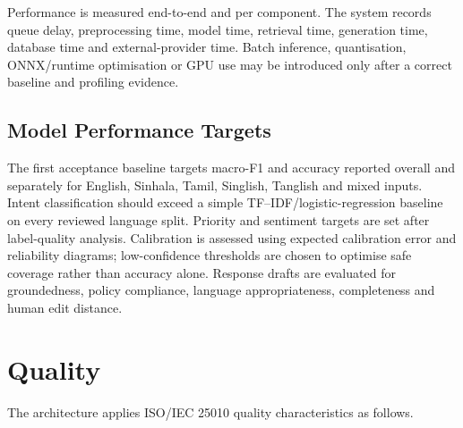 \documentclass[10pt,letterpaper]{article}
\begin{document}
Performance is measured end-to-end and per component. The system records queue delay, preprocessing time, model time, retrieval time, generation time, database time and external-provider time. Batch inference, quantisation, ONNX/runtime optimisation or GPU use may be introduced only after a correct baseline and profiling evidence.

\subsection*{Model Performance Targets}
The first acceptance baseline targets macro-F1 and accuracy reported overall and separately for English, Sinhala, Tamil, Singlish, Tanglish and mixed inputs. Intent classification should exceed a simple TF--IDF/logistic-regression baseline on every reviewed language split. Priority and sentiment targets are set after label-quality analysis. Calibration is assessed using expected calibration error and reliability diagrams; low-confidence thresholds are chosen to optimise safe coverage rather than accuracy alone. Response drafts are evaluated for groundedness, policy compliance, language appropriateness, completeness and human edit distance.

\section{Quality}
The architecture applies ISO/IEC 25010 quality characteristics as follows.
\end{document}
